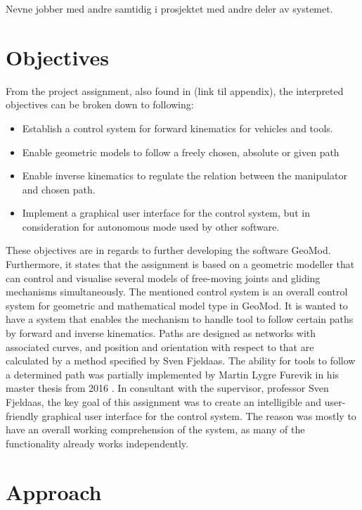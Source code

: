Nevne jobber med andre samtidig i prosjektet med andre deler av systemet.

\section{Objectives}
\label{chap:objectives}

From the project assignment, also found in (link til appendix), the interpreted objectives can be broken down to following:

\begin{itemize}
  \item Establish a control system for forward kinematics for vehicles and tools.
  \item Enable geometric models to follow a freely chosen, absolute or given path
  \item Enable inverse kinematics to regulate the relation between the manipulator and chosen path.  
  \item Implement a graphical user interface for the control system, but in consideration for autonomous mode used by other software.
\end{itemize}


These objectives are in regards to further developing the software GeoMod. Furthermore, it states that the assignment is based on a geometric modeller that can control and visualise several models of free-moving joints and gliding mechanisms simultaneously.  The mentioned control system is an overall control system for geometric and mathematical model type in GeoMod. It is wanted to have a system that enables the mechanism to handle tool to follow certain paths by forward and inverse kinematics. Paths are designed as networks with associated curves, and position and orientation with respect to that are calculated by a method specified by Sven Fjeldaas. The ability for tools to follow a determined path was partially implemented by Martin Lygre Furevik in his master thesis from 2016 \cite{martin}. In consultant with the supervisor, professor Sven Fjeldaas,  the key goal of this assignment was to create an intelligible and user-friendly graphical user interface for the control system. The reason was mostly to have an overall working comprehension of the system, as many of the functionality already works independently.



\section{Approach}

